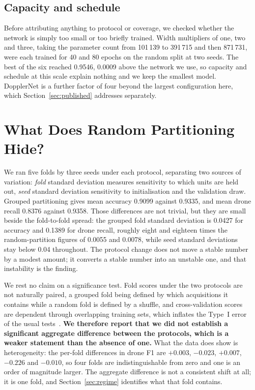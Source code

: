 \documentclass[11pt,a4paper]{article}
\begin{document}
\subsection{Capacity and schedule}
\label{sec:capacity}

Before attributing anything to protocol or coverage, we checked whether the network is simply too small or too briefly trained. Width multipliers of one, two and three, taking the parameter count from 101\,139 to 391\,715 and then 871\,731, were each trained for 40 and 80 epochs on the random split at two seeds. The best of the six reached 0.9546, 0.0009 above the network we use, so capacity and schedule at this scale explain nothing and we keep the smallest model. DopplerNet is a further factor of four beyond the largest configuration here, which Section~\ref{sec:published} addresses separately.

\section{What Does Random Partitioning Hide?}
\label{sec:leak}

We ran five folds by three seeds under each protocol, separating two sources of variation: \emph{fold} standard deviation measures sensitivity to which units are held out, \emph{seed} standard deviation sensitivity to initialisation and the validation draw. Grouped partitioning gives mean accuracy 0.9099 against 0.9335, and mean drone recall 0.8376 against 0.9358. Those differences are not trivial, but they are small beside the fold-to-fold spread: the grouped fold standard deviation is 0.0427 for accuracy and 0.1389 for drone recall, roughly eight and eighteen times the random-partition figures of 0.0055 and 0.0078, while seed standard deviations stay below 0.04 throughout. The protocol change does not move a stable number by a modest amount; it converts a stable number into an unstable one, and that instability is the finding.

We rest no claim on a significance test. Fold scores under the two protocols are not naturally paired, a grouped fold being defined by which acquisitions it contains while a random fold is defined by a shuffle, and cross-validation scores are dependent through overlapping training sets, which inflates the Type~I error of the usual tests~\cite{dietterich1998,nadeau2003}. \textbf{We therefore report that we did not establish a significant aggregate difference between the protocols, which is a weaker statement than the absence of one.} What the data does show is heterogeneity: the per-fold differences in drone F1 are $+0.003$, $-0.023$, $+0.007$, $-0.226$ and $-0.010$, so four folds are indistinguishable from zero and one is an order of magnitude larger. The aggregate difference is not a consistent shift at all; it is one fold, and Section~\ref{sec:regime} identifies what that fold contains.
\end{document}
